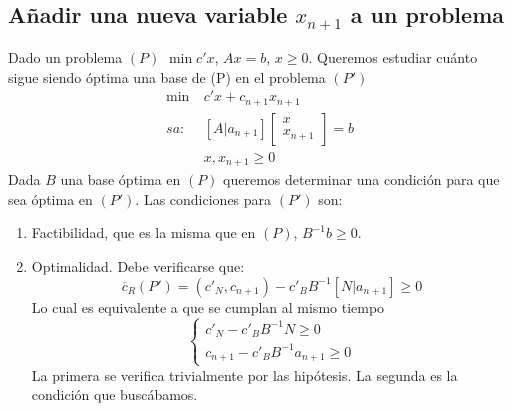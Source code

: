 \documentclass[PM.tex]{subfiles}
\begin{document}
\subsection{Añadir una nueva variable $x_{n+1}$ a un problema}
Dado un problema $(P)$ $\min c'x$, $Ax=b$, $x\geq 0$. Queremos estudiar cuánto sigue siendo óptima una base de (P) en el problema $(P')$
\begin{align*}
\min\ & c'x+c_{n+1}x_{n+1}\\
sa:\ & [A|a_{n+1}]\begin{bmatrix}
x\\
x_{n+1}
\end{bmatrix}=b\\
 &  x,x_{n+1}\geq 0
\end{align*}
Dada $B$ una base óptima en $(P)$ queremos determinar una condición para que sea óptima en $(P')$. Las condiciones para $(P')$ son:
\begin{enumerate}
\item Factibilidad, que es la misma que en $(P)$, $B^{-1}b\geq 0$. 
\item Optimalidad. Debe verificarse que:
\[\overline{c}_R(P')=(c'_N, c_{n+1})-c'_B B^{-1}[N| a_{n+1}]\geq 0\]
Lo cual es equivalente a que se cumplan al mismo tiempo
\[
\begin{cases}c'_N-c'_B B^{-1}N\geq 0\\
c_{n+1}-c'_B B^{-1} a_{n+1}\geq 0\end{cases}\]
La primera se verifica trivialmente por las hipótesis. La segunda es la condición que buscábamos.

\end{enumerate}
\end{document}
